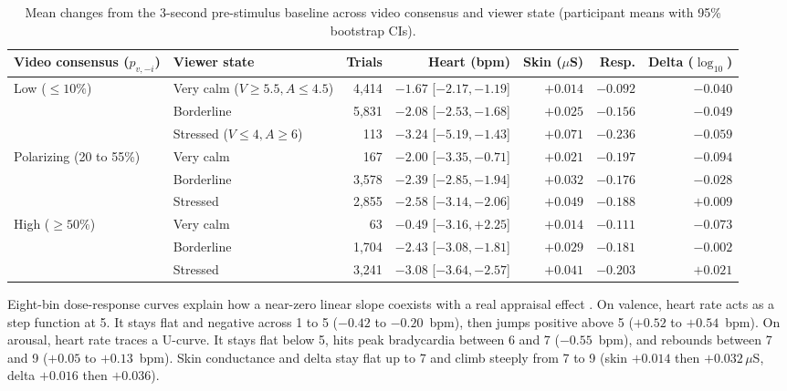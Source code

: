 \documentclass[10pt]{article}
\begin{document}
\begin{table}[t]
\centering\footnotesize
\setlength{\tabcolsep}{4.5pt}
\begin{tabular}{@{}llrrrrr@{}}
\toprule
Video consensus ($p_{v,-i}$) & Viewer state & Trials & Heart (bpm) & Skin ($\mu$S) & Resp. & Delta ($\log_{10}$)\\
\midrule
Low ($\le 10\%$) & Very calm ($V\ge 5.5, A\le 4.5$) & 4,414 & $-1.67$ [$-2.17, -1.19$] & $+0.014$ & $-0.092$ & $-0.040$\\
 & Borderline & 5,831 & $-2.08$ [$-2.53, -1.68$] & $+0.025$ & $-0.156$ & $-0.049$\\
 & Stressed ($V\le 4, A\ge 6$) & 113 & $\mathbf{-3.24}$ [$-5.19, -1.43$] & $\mathbf{+0.071}$ & $-0.236$ & $-0.059$\\
\midrule
Polarizing (20 to 55\%) & Very calm & 167 & $-2.00$ [$-3.35, -0.71$] & $+0.021$ & $-0.197$ & $-0.094$\\
 & Borderline & 3,578 & $-2.39$ [$-2.85, -1.94$] & $+0.032$ & $-0.176$ & $-0.028$\\
 & Stressed & 2,855 & $-2.58$ [$-3.14, -2.06$] & $\mathbf{+0.049}$ & $-0.188$ & $\mathbf{+0.009}$\\
\midrule
High ($\ge 50\%$) & Very calm & 63 & $\mathbf{-0.49}$ [$-3.16, +2.25$] & $\mathbf{+0.014}$ & $-0.111$ & $-0.073$\\
 & Borderline & 1,704 & $-2.43$ [$-3.08, -1.81$] & $+0.029$ & $-0.181$ & $-0.002$\\
 & Stressed & 3,241 & $\mathbf{-3.08}$ [$-3.64, -2.57$] & $\mathbf{+0.041}$ & $-0.203$ & $\mathbf{+0.021}$\\
\bottomrule
\end{tabular}
\caption{Mean changes from the 3-second pre-stimulus baseline across video consensus and viewer state (participant means with 95\% bootstrap CIs).}
\label{tab:matrix2x2}
\end{table}

Eight-bin dose-response curves explain how a near-zero linear slope coexists with a real appraisal effect \cite{mauss2005,golland2014}. On valence, heart rate acts as a step function at 5. It stays flat and negative across 1 to 5 ($-0.42$ to $-0.20$~bpm), then jumps positive above 5 ($+0.52$ to $+0.54$~bpm). On arousal, heart rate traces a U-curve. It stays flat below 5, hits peak bradycardia between 6 and 7 ($-0.55$~bpm), and rebounds between 7 and 9 ($+0.05$ to $+0.13$~bpm). Skin conductance and delta stay flat up to 7 and climb steeply from 7 to 9 (skin $+0.014$ then $+0.032\,\mu$S, delta $+0.016$ then $+0.036$).
\end{document}
